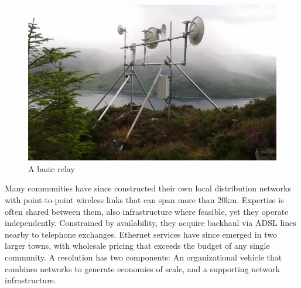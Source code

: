 \begin{figure}[h]
\centering
 \includegraphics[width=\columnwidth]{figs/mhialairigh-from-behind}
 \caption{A basic relay}
\label{fig:mhialairigh}
\end{figure}



Many communities have since constructed their own local distribution networks
with point-to-point wireless links that can span more than 20km. Expertise is
often shared between them, also infrastructure where feasible, yet they operate
independently. Constrained by availability, they acquire backhaul via ADSL lines
nearby to telephone exchanges. Ethernet services have since emerged in two
larger towns, with wholesale pricing that exceeds the budget of any single
community. A resolution has two components: An organizational vehicle that
combines networks to generate economies of scale, and a supporting network
infrastructure.

